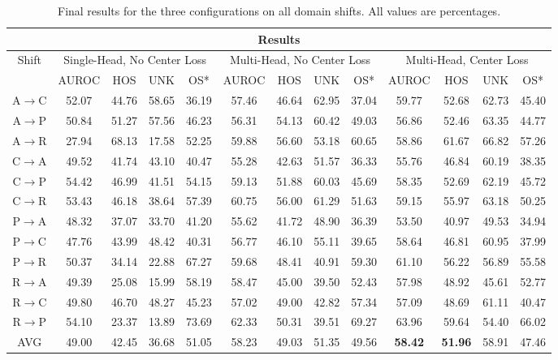 \documentclass[10pt,twocolumn,letterpaper]{article}
\begin{document}
\begin{table}
  \centering
  \begin{tabular}[t]{||c||c|c|c|c||c|c|c|c||c|c|c|c||}
    \hline
    \multicolumn{13}{||c||}{Results} \\
    \hline
    \multirow{2}{*}{Shift}   & \multicolumn{4}{|c||}{Single-Head, No Center Loss} & \multicolumn{4}{|c||}{Multi-Head, No Center Loss} & \multicolumn{4}{|c||}{Multi-Head, Center Loss} \\
            & AUROC & HOS   & UNK   & OS*   & AUROC & HOS   & UNK   & OS*   & AUROC & HOS   & UNK   & OS*   \\
    \hline
    A$\to$C & 52.07 & 44.76 & 58.65 & 36.19 & 57.46 & 46.64 & 62.95 & 37.04 & 59.77 & 52.68 & 62.73 & 45.40 \\
    A$\to$P & 50.84 & 51.27 & 57.56 & 46.23 & 56.31 & 54.13 & 60.42 & 49.03 & 56.86 & 52.46 & 63.35 & 44.77 \\
    A$\to$R & 27.94 & 68.13 & 17.58 & 52.25 & 59.88 & 56.60 & 53.18 & 60.65 & 58.86 & 61.67 & 66.82 & 57.26 \\
    C$\to$A & 49.52 & 41.74 & 43.10 & 40.47 & 55.28 & 42.63 & 51.57 & 36.33 & 55.76 & 46.84 & 60.19 & 38.35 \\
    C$\to$P & 54.42 & 46.99 & 41.51 & 54.15 & 59.13 & 51.88 & 60.03 & 45.69 & 58.35 & 52.69 & 62.19 & 45.72 \\
    C$\to$R & 53.43 & 46.18 & 38.64 & 57.39 & 60.75 & 56.00 & 61.29 & 51.63 & 59.15 & 55.97 & 63.18 & 50.25 \\
    P$\to$A & 48.32 & 37.07 & 33.70 & 41.20 & 55.62 & 41.72 & 48.90 & 36.39 & 53.50 & 40.97 & 49.53 & 34.94 \\
    P$\to$C & 47.76 & 43.99 & 48.42 & 40.31 & 56.77 & 46.10 & 55.11 & 39.65 & 58.64 & 46.81 & 60.95 & 37.99 \\
    P$\to$R & 50.37 & 34.14 & 22.88 & 67.27 & 59.68 & 48.41 & 40.91 & 59.30 & 61.10 & 56.22 & 56.89 & 55.58 \\
    R$\to$A & 49.39 & 25.08 & 15.99 & 58.19 & 58.47 & 45.00 & 39.50 & 52.43 & 57.98 & 48.92 & 45.61 & 52.77 \\
    R$\to$C & 49.80 & 46.70 & 48.27 & 45.23 & 57.02 & 49.00 & 42.82 & 57.34 & 57.09 & 48.69 & 61.11 & 40.47 \\
    R$\to$P & 54.10 & 23.37 & 13.89 & 73.69 & 62.33 & 50.31 & 39.51 & 69.27 & 63.96 & 59.64 & 54.40 & 66.02 \\
    \hline
    AVG     & 49.00 & 42.45 & 36.68 & 51.05 & 58.23 & 49.03 & 51.35 & 49.56 & {\bf 58.42} & {\bf 51.96} & 58.91 & 47.46 \\ 
    \hline
  \end{tabular}
  \caption{\centering\label{tab:results}Final results for the three configurations on all domain shifts. All values are percentages.}
\end{table}

\clearpage
{\small
\nocite{BucciROS}


}
\end{document}
